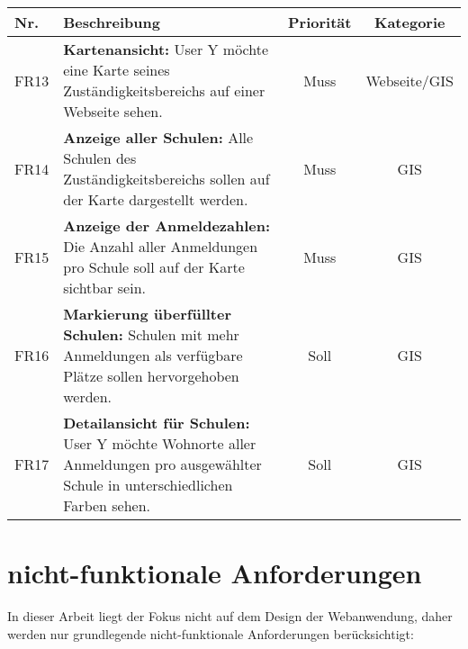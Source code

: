 \begin{center}
    \begin{tabular}{l p{8cm} c c}
        \hline
        \textbf{Nr.} & \textbf{Beschreibung} & \textbf{Priorität} & \textbf{Kategorie} \\ \hline
            FR13 & \textbf{Kartenansicht:} User Y möchte eine Karte seines Zuständigkeitsbereichs auf einer Webseite sehen. &Muss &Webseite/GIS \\ 
            FR14 & \textbf{Anzeige aller Schulen:} Alle Schulen des Zuständigkeitsbereichs sollen auf der Karte dargestellt werden. &Muss &GIS \\ 
            FR15 & \textbf{Anzeige der Anmeldezahlen:} Die Anzahl aller Anmeldungen pro Schule soll auf der Karte sichtbar sein. &Muss &GIS \\ 
            FR16 & \textbf{Markierung überfüllter Schulen:} Schulen mit mehr Anmeldungen als verfügbare Plätze sollen hervorgehoben werden. &Soll &GIS \\ 
            FR17 & \textbf{Detailansicht für Schulen:} User Y möchte Wohnorte aller Anmeldungen pro ausgewählter Schule in unterschiedlichen Farben sehen. &Soll &GIS \\ \hline
        \end{tabular}
    \label{tab:sachbearbeiterAnforderungen}
\end{center}

\section{nicht-funktionale Anforderungen}
In dieser Arbeit liegt der Fokus nicht auf dem Design der Webanwendung, daher werden nur grundlegende nicht-funktionale Anforderungen berücksichtigt:

